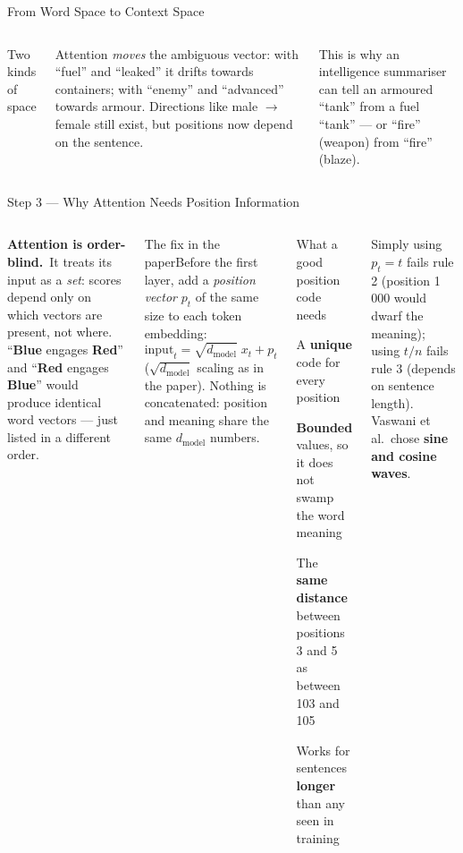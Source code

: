 \documentclass[aspectratio=169,10pt]{beamer}
\begin{document}
\begin{frame}{From Word Space to Context Space}
\begin{columns}[T]
\begin{cbox}{Two kinds of space}
\begin{tl}
\end{tl}
\end{cbox}
\begin{rbox}\scriptsize Attention \emph{moves} the ambiguous vector: with ``fuel'' and ``leaked'' it drifts towards containers; with ``enemy'' and ``advanced'' towards armour. Directions like male $\to$ female still exist, but positions now depend on the sentence.\end{rbox}
\begin{ibox}\scriptsize This is why an intelligence summariser can tell an armoured ``tank'' from a fuel ``tank'' --- or ``fire'' (weapon) from ``fire'' (blaze).\end{ibox}
\end{columns}
\end{frame}

\begin{frame}{Step 3 --- Why Attention Needs Position Information}
\begin{columns}[T]
\begin{wbox}\textbf{Attention is order-blind.}\ \scriptsize It treats its input as a \emph{set}: scores depend only on which vectors are present, not where. ``\textbf{Blue} engages \textbf{Red}'' and ``\textbf{Red} engages \textbf{Blue}'' would produce identical word vectors --- just listed in a different order.\end{wbox}
\begin{cbox}{The fix in the paper}\scriptsize Before the first layer, add a \emph{position vector} $p_t$ of the same size to each token embedding:
\[\text{input}_t=\sqrt{d_{\text{model}}}\;x_t+p_t\]
($\sqrt{d_{\text{model}}}$ scaling as in the paper). Nothing is concatenated: position and meaning share the same $d_{\text{model}}$ numbers.\end{cbox}
\begin{cbox}[ISSAnavy]{What a good position code needs}
\begin{te}
\item A \textbf{unique} code for every position
\item \textbf{Bounded} values, so it does not swamp the word meaning
\item The \textbf{same distance} between positions 3 and 5 as between 103 and 105
\item Works for sentences \textbf{longer} than any seen in training
\end{te}
\end{cbox}
\begin{ibox}\scriptsize Simply using $p_t=t$ fails rule 2 (position 1\,000 would dwarf the meaning); using $t/n$ fails rule 3 (depends on sentence length). Vaswani et al.\ chose \textbf{sine and cosine waves}.\end{ibox}
\end{columns}
\end{frame}
\end{document}
